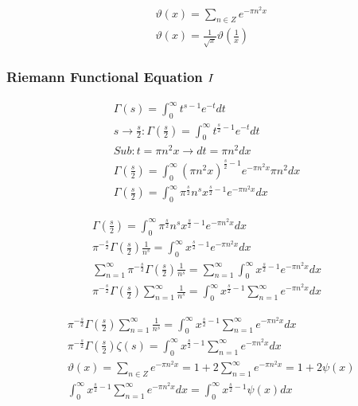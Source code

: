 	$$
	\begin{aligned}
		& \vartheta(x)=\sum_{n \in Z} e^{-\pi n^2 x} \\
		& \vartheta(x)=\frac{1}{\sqrt{x}} \vartheta\left(\frac{1}{x}\right)
	\end{aligned}
	$$
	
	\subsubsection{Riemann Functional Equation $\RNumb{1}$}
	
	$$
	\begin{gathered}
		\Gamma(s)=\int_0^{\infty} t^{s-1} e^{-t} d t \\
		s \rightarrow \frac{s}{2}: \Gamma\left(\frac{s}{2}\right)=\int_0^{\infty} t^{\frac{s}{2}-1} e^{-t} d t \\
		S u b: t=\pi n^2 x \rightarrow d t=\pi n^2 d x \\
		\Gamma\left(\frac{s}{2}\right)=\int_0^{\infty}\left(\pi n^2 x\right)^{\frac{s}{2}-1} e^{-\pi n^2 x} \pi n^2 d x \\
		\Gamma\left(\frac{s}{2}\right)=\int_0^{\infty} \pi^{\frac{s}{2}} n^s x^{\frac{s}{2}-1} e^{-\pi n^2 x} d x
	\end{gathered}
	$$
	
	$$
	\begin{gathered}
		\Gamma\left(\frac{s}{2}\right)=\int_0^{\infty} \pi^{\frac{s}{2}} n^s x^{\frac{s}{2}-1} e^{-\pi n^2 x} d x \\
		\pi^{-\frac{s}{2}} \Gamma\left(\frac{s}{2}\right) \frac{1}{n^s}=\int_0^{\infty} x^{\frac{s}{2}-1} e^{-\pi n^2 x} d x \\
		\sum_{n=1}^{\infty} \pi^{-\frac{s}{2}} \Gamma\left(\frac{s}{2}\right) \frac{1}{n^s}=\sum_{n=1}^{\infty} \int_0^{\infty} x^{\frac{s}{2}-1} e^{-\pi n^2 x} d x \\
		\pi^{-\frac{s}{2}} \Gamma\left(\frac{s}{2}\right) \sum_{n=1}^{\infty} \frac{1}{n^s}=\int_0^{\infty} x^{\frac{s}{2}-1} \sum_{n=1}^{\infty} e^{-\pi n^2 x} d x
	\end{gathered}
	$$
	
	$$
	\begin{aligned}
		& \pi^{-\frac{s}{2}} \Gamma\left(\frac{s}{2}\right) \sum_{n=1}^{\infty} \frac{1}{n^s}=\int_0^{\infty} x^{\frac{s}{2}-1} \sum_{n=1}^{\infty} e^{-\pi n^2 x} d x \\
		& \pi^{-\frac{s}{2}} \Gamma\left(\frac{s}{2}\right) \zeta(s)=\int_0^{\infty} x^{\frac{s}{2}-1} \sum_{n=1}^{\infty} e^{-\pi n^2 x} d x \\
		& \vartheta(x)=\sum_{n \in Z} e^{-\pi n^2 x}=1+2 \sum_{n=1}^{\infty} e^{-\pi n^2 x}=1+2 \psi(x) \\
		& \int_0^{\infty} x^{\frac{s}{2}-1} \sum_{n=1}^{\infty} e^{-\pi n^2 x} d x=\int_0^{\infty} x^{\frac{s}{2}-1} \psi(x) d x
	\end{aligned}
	$$
	
